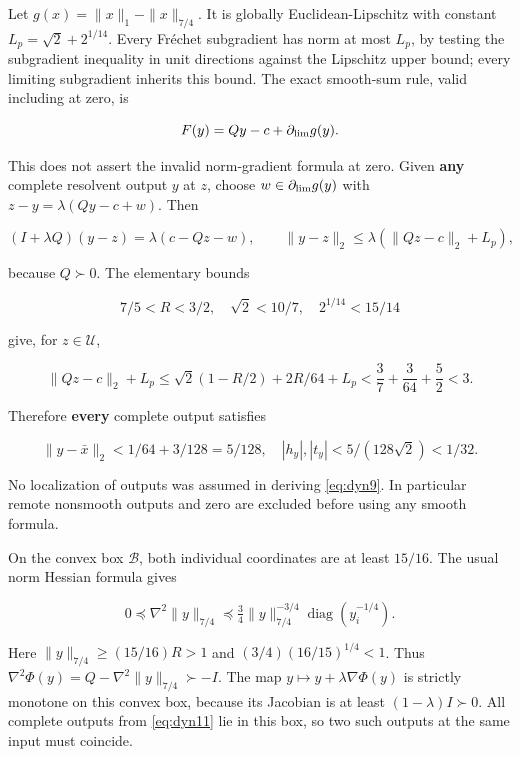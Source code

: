 \documentclass[11pt]{article}
\theoremstyle{remark}\newtheorem{remark}[theorem]{Remark}
\begin{document}
Let \(g(x)=\|x\|_1-\|x\|_{7/4}\). It is globally Euclidean-Lipschitz with constant
\(L_p=\sqrt2+2^{1/14}\). Every Fr\'echet subgradient has norm at most \(L_p\), by testing the subgradient inequality in unit directions against the Lipschitz upper bound; every limiting subgradient inherits this bound. The exact smooth-sum rule, valid including at zero, is

\[
F(y)=Qy-c+\partial_{\rm lim}g(y).
\]

This does not assert the invalid norm-gradient formula at zero. Given \textbf{any} complete resolvent output \(y\) at \(z\), choose \(w\in\partial_{\rm lim}g(y)\) with \(z-y=\lambda(Qy-c+w)\). Then

\begin{equation}
(I+\lambda Q)(y-z)=\lambda(c-Qz-w),\qquad
\|y-z\|_2\le\lambda(\|Qz-c\|_2+L_p), \label{eq:dyn9}
\end{equation}

because \(Q\succ0\). The elementary bounds

\[
7/5<R<3/2,\quad \sqrt2<10/7,\quad 2^{1/14}<15/14
\]

give, for \(z\in\mathcal U\),

\begin{equation}
\|Qz-c\|_2+L_p
\le\sqrt2(1-R/2)+2R/64+L_p
<\frac37+\frac3{64}+\frac52<3. \label{eq:dyn10}
\end{equation}

Therefore \textbf{every} complete output satisfies

\begin{equation}
\|y-\bar x\|_2<1/64+3/128=5/128,
\quad |h_y|,|t_y|<5/(128\sqrt2)<1/32. \label{eq:dyn11}
\end{equation}

No localization of outputs was assumed in deriving \eqref{eq:dyn9}. In particular remote nonsmooth outputs and zero are excluded before using any smooth formula.

On the convex box \(\mathcal B\), both individual coordinates are at least \(15/16\). The usual norm Hessian formula gives

\[
0\preceq\nabla^2\|y\|_{7/4}
\preceq\tfrac34\|y\|_{7/4}^{-3/4}
\operatorname{diag}(y_i^{-1/4}).
\]

Here \(\|y\|_{7/4}\ge(15/16)R>1\) and
\((3/4)(16/15)^{1/4}<1\). Thus
\(\nabla^2\Phi(y)=Q-\nabla^2\|y\|_{7/4}\succ-I\).
The map \(y\mapsto y+\lambda\nabla\Phi(y)\) is strictly monotone on this convex box, because its Jacobian is at least \((1-\lambda)I\succ0\). All complete outputs from \eqref{eq:dyn11} lie in this box, so two such outputs at the same input must coincide.
\end{document}
